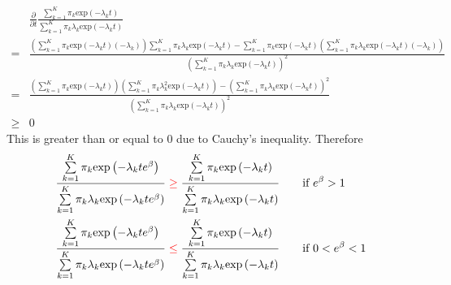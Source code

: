\documentclass[a4paper,12pt]{article}
\begin{document}
\[
  \begin{aligned}
    & \frac{\partial}{\partial t}
      \frac{
      \sum\limits_{k = 1}^K\pi_k
      \mathrm{exp}\left(-\lambda_kt\right)
      }{
      \sum\limits_{k = 1}^K\pi_k
      \lambda_k
      \mathrm{exp}\left(- \lambda_kt\right)
      }    \\
      =& \frac{
      \left(
      \sum\limits_{k = 1}^K\pi_k
      \mathrm{exp}\left(-\lambda_kt\right)
      \left(-\lambda_k\right)
      \right)
      \sum\limits_{k = 1}^K\pi_k
      \lambda_k
      \mathrm{exp}\left(- \lambda_kt\right)
      -
      \sum\limits_{k = 1}^K\pi_k
      \mathrm{exp}\left(-\lambda_kt\right)
      \left(
      \sum\limits_{k = 1}^K\pi_k
      \lambda_k
      \mathrm{exp}\left(- \lambda_kt\right)
      \left(-\lambda_k\right)
      \right)
      }{\left(
      \sum\limits_{k = 1}^K\pi_k
      \lambda_k
      \mathrm{exp}\left(- \lambda_kt\right)
         \right)^2}    \\
    =& \frac{\left(
       \sum\limits_{k = 1}^K\pi_k
       \mathrm{exp}\left(-\lambda_kt\right)
       \right)
       \left(
       \sum\limits_{k = 1}^K\pi_k
       \lambda_k^2
       \mathrm{exp}\left(- \lambda_kt\right)
       \right)
       -
       \left(
       \sum\limits_{k = 1}^K\pi_k\lambda_k
       \mathrm{exp}\left(-\lambda_kt\right)
       \right)^2
       }{\left(
       \sum\limits_{k = 1}^K\pi_k
       \lambda_k
       \mathrm{exp}\left(- \lambda_kt\right)
       \right)^2
       }    \\
       \geq& 0
  \end{aligned}
\]
This is greater than or equal to 0 due to Cauchy's inequality. Therefore
\[
  \begin{aligned}
    \frac{
    \sum\limits_{k = 1}^K\pi_k
    \mathrm{exp}\left(-\lambda_kt e^\beta\right)
    }{
    \sum\limits_{k = 1}^K\pi_k
    \lambda_k
    \mathrm{exp}\left(- \lambda_kt e^\beta\right)}
    &{\color{red}\;\geq\;}
      \frac{
      \sum\limits_{k = 1}^K\pi_k
      \mathrm{exp}\left(-\lambda_kt \right)
      }{
      \sum\limits_{k = 1}^K\pi_k
      \lambda_k
      \mathrm{exp}\left(- \lambda_kt \right)}
    && \quad \text{if } e^\beta > 1    \\
    \frac{
    \sum\limits_{k = 1}^K\pi_k
    \mathrm{exp}\left(-\lambda_kt e^\beta\right)
    }{
    \sum\limits_{k = 1}^K\pi_k
    \lambda_k
    \mathrm{exp}\left(- \lambda_kt e^\beta\right)}
    &{\color{red}\;\leq\;}
      \frac{
      \sum\limits_{k = 1}^K\pi_k
      \mathrm{exp}\left(-\lambda_kt \right)
      }{
      \sum\limits_{k = 1}^K\pi_k
      \lambda_k
      \mathrm{exp}\left(- \lambda_kt \right)}
    && \quad \text{if } 0 < e^\beta < 1    \\
  \end{aligned}
\]
\end{document}
